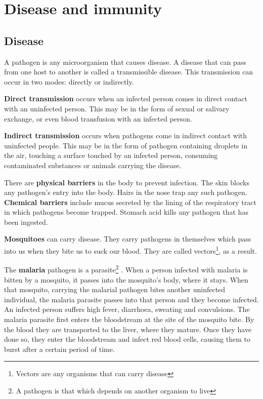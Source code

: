 \section{Disease and immunity}
\subsection{Disease}
A pathogen is any microorganism that causes disease. A disease that can pass from one host to 
another is called a transmissible disease. This transmission can occur in two modes: directly or
indirectly.

\textbf{Direct transmission} occurs when an infected person comes in direct contact with an 
uninfected person. This may be in the form of sexual or salivary exchange, or even blood 
transfusion with an infected person.

\textbf{Indirect transmission} occurs when pathogens come in indirect contact with uninfected 
people. This may be in the form of pathogen containing droplets in the air, touching a surface
touched by an infected person, consuming contaminated substances or animals carrying the disease.

There are \textbf{physical barriers} in the body to prevent infection. The skin blocks any 
pathogen's entry into the body. Hairs in the nose trap any such pathogen. \textbf{Chemical barriers}
include mucus secreted by the lining of the respiratory tract in which pathogens become trapped.
Stomach acid kills any pathogen that has been ingested.

\textbf{Mosquitoes} can carry disease. They carry pathogens in themselves which pass into us when
they bite us to suck our blood. They are called vectors\footnote{Vectors are any organisms
that can carry disease}, as a result.

The \textbf{malaria} pathogen is a parasite\footnote{A pathogen is that which depends on another
organism to live}
. When a person infected with malaria is bitten by a
mosquito, it passes into the mosquito's body, where it stays. When that mosquito, carrying the
malarial pathogen bites another uninfected individual, the malaria parasite passes into that person
and they become infected. An infected person suffers high fever, diarrhoea, sweating and 
convulsions. The malaria parasite first enters the bloodstream at the site of the mosquito bite. By
the blood they are transported to the liver, where they mature. Once they have done so, they enter
the bloodstream and infect red blood cells, causing them to burst after a certain period of 
time.

